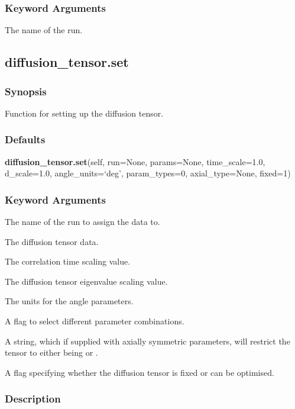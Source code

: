 \subsubsection{Keyword Arguments}


  The name of the run.


\newpage

\subsection{diffusion\_tensor.set}


\subsubsection{Synopsis}

Function for setting up the diffusion tensor.

\subsubsection{Defaults}

\textsf{\textbf{diffusion\_tensor.set}(self, run=None, params=None, time\_scale=1.0, d\_scale=1.0, angle\_units=`deg', param\_types=0, axial\_type=None, fixed=1)}


\subsubsection{Keyword Arguments}


  The name of the run to assign the data to.

  The diffusion tensor data.

  The correlation time scaling value.

  The diffusion tensor eigenvalue scaling value.

  The units for the angle parameters.

  A flag to select different parameter combinations.

  A string, which if supplied with axially symmetric parameters, will restrict the tensor to either being 
 or 
.

  A flag specifying whether the diffusion tensor is fixed or can be optimised.

\subsubsection{Description}

